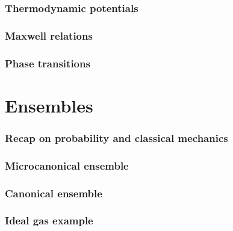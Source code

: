 \documentclass[letter-paper]{tufte-book}
\begin{document}
\subsection{Thermodynamic potentials}


\subsection{Maxwell relations}


\subsection{Phase transitions}


\chapter{Ensembles}


\subsection{Recap on probability and classical mechanics}


\subsection{Microcanonical ensemble}


\subsection{Canonical ensemble}


\subsection{Ideal gas example}
\end{document}
